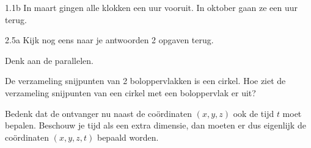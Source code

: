\begin{Hint}{1.1b}
            In maart gingen alle klokken een uur vooruit. In oktober gaan ze een uur terug.
        
\end{Hint}
\begin{Hint}{2.5a}
			Kijk nog eens naar je antwoorden 2 opgaven terug.
		
\end{Hint}
\begin{Hint}{2.14}
		Denk aan de parallelen.
	
\end{Hint}
\begin{Hint}{4.9}
		De verzameling snijpunten van 2 boloppervlakken is een cirkel. Hoe ziet de verzameling snijpunten van een cirkel met een boloppervlak er uit?
	
\end{Hint}
\begin{Hint}{4.15}
		Bedenk dat de ontvanger nu naast de co\"ordinaten $(x, y, z)$ ook de tijd $t$ moet bepalen. Beschouw je tijd als een extra dimensie, dan moeten er dus eigenlijk de co\"ordinaten $(x, y, z, t)$ bepaald worden.
	
\end{Hint}
